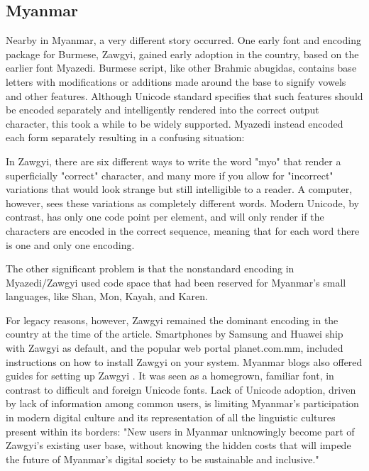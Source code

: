 \subsection{Myanmar}

Nearby in Myanmar, a very different story occurred. One early font and encoding
package for Burmese, Zawgyi, gained early adoption in the country, based on the
earlier font Myazedi. Burmese script, like other Brahmic abugidas, contains
base letters with modifications or additions made around the base to signify
vowels and other features. Although Unicode standard specifies that such
features should be encoded separately and intelligently rendered into the
correct output character, this took a while to be widely supported. Myazedi
instead encoded each form separately resulting in a confusing situation:

\begin{aquote}{\textcite{hotchkiss16}}
In Zawgyi, there are six different ways to write the word "myo" that render a
superficially "correct" character, and many more if you allow for "incorrect"
variations that would look strange but still intelligible to a reader. A
computer, however, sees these variations as completely different words. Modern
Unicode, by contrast, has only one code point per element, and will only render
if the characters are encoded in the correct sequence, meaning that for each
word there is one and only one encoding.
\end{aquote}

The other significant problem is that the nonstandard encoding in Myazedi/Zawgyi
used code space that had been reserved for Myanmar's small languages, like
Shan, Mon, Kayah, and Karen.

For legacy reasons, however, Zawgyi remained the dominant encoding in the
country at the time of the article. Smartphones by Samsung and Huawei ship with
Zawgyi as default, and the popular web portal planet.com.mm, included
instructions on how to install Zawgyi on your system. Myanmar blogs also offered
guides for setting up Zawgyi \parencite{hotchkiss16}. It was seen as a
homegrown, familiar font, in contrast to difficult and foreign Unicode fonts.
Lack of Unicode adoption, driven by lack of information among common users, is
limiting Myanmar's participation in modern digital culture and its
representation of all the linguistic cultures present within its borders: "New
users in Myanmar unknowingly become part of Zawgyi’s existing user base, without
knowing the hidden costs that will impede the future of Myanmar’s digital
society to be sustainable and inclusive." \parencite{liao17}
